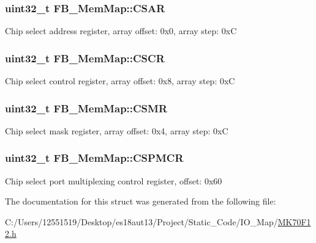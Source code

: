 \subsubsection[{C\+S\+A\+R}]{\setlength{\rightskip}{0pt plus 5cm}uint32\+\_\+t F\+B\+\_\+\+Mem\+Map\+::\+C\+S\+A\+R}\label{struct_f_b___mem_map_aa59ea1aff2f195dc7d41ef8611884381}
Chip select address register, array offset\+: 0x0, array step\+: 0x\+C \hypertarget{struct_f_b___mem_map_a7a1e48a5fde6382a076243009f5c0846}{}
\subsubsection[{C\+S\+C\+R}]{\setlength{\rightskip}{0pt plus 5cm}uint32\+\_\+t F\+B\+\_\+\+Mem\+Map\+::\+C\+S\+C\+R}\label{struct_f_b___mem_map_a7a1e48a5fde6382a076243009f5c0846}
Chip select control register, array offset\+: 0x8, array step\+: 0x\+C \hypertarget{struct_f_b___mem_map_a02c1e1542339e83d168a52e763f60228}{}
\subsubsection[{C\+S\+M\+R}]{\setlength{\rightskip}{0pt plus 5cm}uint32\+\_\+t F\+B\+\_\+\+Mem\+Map\+::\+C\+S\+M\+R}\label{struct_f_b___mem_map_a02c1e1542339e83d168a52e763f60228}
Chip select mask register, array offset\+: 0x4, array step\+: 0x\+C \hypertarget{struct_f_b___mem_map_a7876f1f5e2d0718968b09242af73b600}{}
\subsubsection[{C\+S\+P\+M\+C\+R}]{\setlength{\rightskip}{0pt plus 5cm}uint32\+\_\+t F\+B\+\_\+\+Mem\+Map\+::\+C\+S\+P\+M\+C\+R}\label{struct_f_b___mem_map_a7876f1f5e2d0718968b09242af73b600}
Chip select port multiplexing control register, offset\+: 0x60 

The documentation for this struct was generated from the following file\+:\begin{DoxyCompactItemize}
\item 
C\+:/\+Users/12551519/\+Desktop/es18aut13/\+Project/\+Static\+\_\+\+Code/\+I\+O\+\_\+\+Map/\hyperlink{_m_k70_f12_8h}{M\+K70\+F12.\+h}\end{DoxyCompactItemize}
